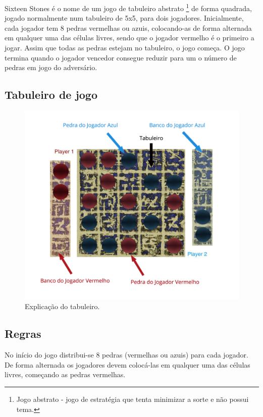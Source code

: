 \documentclass[a4paper]{article}
\begin{document}
Sixteen Stones é o nome de um jogo de tabuleiro abstrato \footnote{Jogo abstrato - jogo de estratégia que tenta minimizar a sorte e não possui tema.} de forma quadrada, jogado normalmente num tabuleiro de 5x5, para dois jogadores. Inicialmente, cada jogador tem 8 pedras vermelhas ou azuis, colocando-as de forma alternada em qualquer uma das células livres, sendo que o jogador vermelho é o primeiro a jogar. Assim que todas as pedras estejam no tabuleiro, o jogo começa. O jogo termina quando o jogador vencedor consegue reduzir para um o número de pedras em jogo do adversário.

\subsection{Tabuleiro de jogo}

\begin{figure}[!htb]
	\centering
	\includegraphics[scale=0.3]{board_explained.png} 
	\caption{Explicação do tabuleiro.}
\end{figure}

\newpage

\subsection{Regras}

No início do jogo distribui-se 8 pedras (vermelhas ou azuis) para cada jogador. De forma alternada os jogadores devem colocá-las em qualquer uma das células livres, começando as pedras vermelhas.
\end{document}
